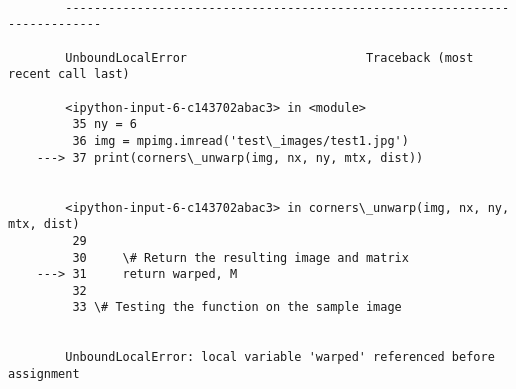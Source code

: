 \documentclass[11pt]{article}
\begin{document}
    \begin{Verbatim}[commandchars=\\\{\}]

        ---------------------------------------------------------------------------

        UnboundLocalError                         Traceback (most recent call last)

        <ipython-input-6-c143702abac3> in <module>
         35 ny = 6
         36 img = mpimg.imread('test\_images/test1.jpg')
    ---> 37 print(corners\_unwarp(img, nx, ny, mtx, dist))
    

        <ipython-input-6-c143702abac3> in corners\_unwarp(img, nx, ny, mtx, dist)
         29 
         30     \# Return the resulting image and matrix
    ---> 31     return warped, M
         32 
         33 \# Testing the function on the sample image
    

        UnboundLocalError: local variable 'warped' referenced before assignment

    \end{Verbatim}
\end{document}
